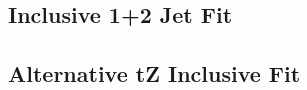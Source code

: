 

\subsection{Inclusive 1+2 Jet Fit}
\label{sec:incFit}


\subsection{Alternative tZ Inclusive Fit}
\label{sec:inc_tZ}

